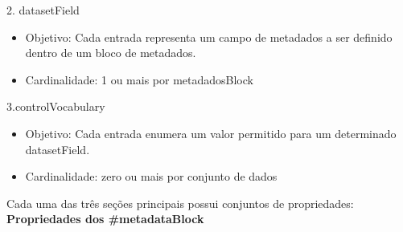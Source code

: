 \documentclass[12pt,hidelinks]{article}
\begin{document}
2. datasetField

\begin{itemize}

\item Objetivo: Cada entrada representa um campo de metadados a ser definido dentro de um bloco de metadados.

\item Cardinalidade: 1 ou mais por metadadosBlock

\end{itemize}

3.controlVocabulary

\begin{itemize}

\item Objetivo: Cada entrada enumera um valor permitido para um determinado datasetField.

\item Cardinalidade: zero ou mais por conjunto de dados

\end{itemize}

Cada uma das três seções principais possui conjuntos de propriedades:\\

\textbf{Propriedades dos \#metadataBlock}\\
\end{document}

